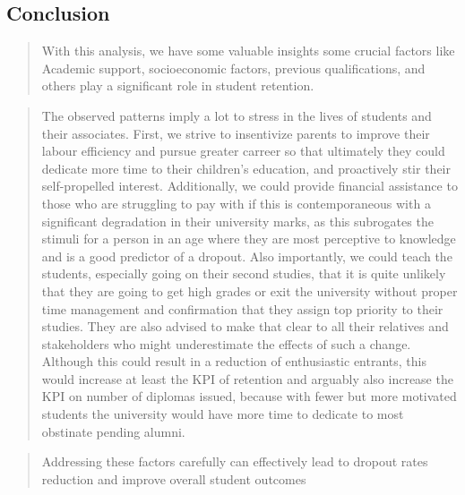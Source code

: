 \documentclass[
  letterpaper,
  DIV=11,
  numbers=noendperiod]{scrartcl}
\begin{document}
\hypertarget{conclusion}{%
\subsection{\texorpdfstring{\textbf{Conclusion}}{Conclusion}}\label{conclusion}}

\begin{quote}
With this analysis, we have some valuable insights some crucial factors
like Academic support, socioeconomic factors, previous qualifications,
and others play a significant role in student retention.
\end{quote}

\begin{quote}
The observed patterns imply a lot to stress in the lives of students and
their associates. First, we strive to insentivize parents to improve
their labour efficiency and pursue greater carreer so that ultimately
they could dedicate more time to their children's education, and
proactively stir their self-propelled interest. Additionally, we could
provide financial assistance to those who are struggling to pay with if
this is contemporaneous with a significant degradation in their
university marks, as this subrogates the stimuli for a person in an age
where they are most perceptive to knowledge and is a good predictor of a
dropout. Also importantly, we could teach the students, especially going
on their second studies, that it is quite unlikely that they are going
to get high grades or exit the university without proper time management
and confirmation that they assign top priority to their studies. They
are also advised to make that clear to all their relatives and
stakeholders who might underestimate the effects of such a change.
Although this could result in a reduction of enthusiastic entrants, this
would increase at least the KPI of retention and arguably also increase
the KPI on number of diplomas issued, because with fewer but more
motivated students the university would have more time to dedicate to
most obstinate pending alumni.
\end{quote}

\begin{quote}
Addressing these factors carefully can effectively lead to dropout rates
reduction and improve overall student outcomes
\end{quote}


\printbibliography
\end{document}
